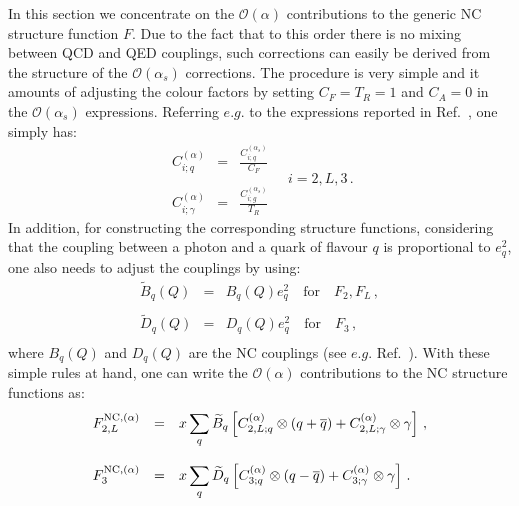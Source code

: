 In this section we concentrate on the $\mathcal{O}(\alpha)$
contributions to the generic NC structure function $F$. Due to the
fact that to this order there is no mixing between QCD and QED
couplings, such corrections can easily be derived from the structure
of the $\mathcal{O}(\alpha_s)$ corrections. The procedure is very
simple and it amounts of adjusting the colour factors by setting
$C_F=T_R=1$ and $C_A=0$ in the $\mathcal{O}(\alpha_s)$
expressions. Referring $e.g.$ to the expressions reported in
Ref.~\cite{Ellis:1991qj}, one simply has:
\begin{equation}\label{eq:alphaCFs}
\begin{array}{rcl}
\displaystyle C_{i;q}^{(\alpha)} &=& \displaystyle \frac{C_{i;q}^{(\alpha_s)}}{C_F}\\
\\
\displaystyle C_{i;\gamma}^{(\alpha)} &=& \displaystyle \frac{C_{i;g}^{(\alpha_s)}}{T_R}
\end{array}\quad i = 2,L,3\,.
\end{equation}
In addition, for constructing the corresponding structure functions,
considering that the coupling between a photon and a quark of flavour
$q$ is proportional to $e_q^2$, one also needs to adjust the couplings
by using:
 \begin{equation}
\begin{array}{rcl}
\widetilde{B}_q(Q) &=& B_q(Q)e_q^2\quad\mbox{for}\quad F_2,F_L\,, \\
\\
\widetilde{D}_q(Q) &=& D_q(Q)e_q^2\quad\mbox{for}\quad F_3\,, \\
\end{array}
\end{equation}
where $B_q(Q)$ and $D_q(Q)$ are the NC couplings (see $e.g.$
Ref.~\cite{Adloff:2003uh}). With these simple rules at hand, one can
write the $\mathcal{O}(\alpha)$ contributions to the NC structure
functions as:
\begin{equation}
\begin{array}{rcl}
F_{2,L}^{{\rm NC},(\alpha)} &=& \displaystyle x \sum_{q} \widetilde{B}_q\left[C_{2,L;q}^{(\alpha)}\otimes
(q+\overline{q}) + C_{2,L;\gamma}^{(\alpha)} \otimes \gamma
                         \right]\,,\\
\\
F_3^{{\rm NC},(\alpha)} &=& \displaystyle x \sum_{q} \widetilde{D}_q\left[C_{3;q}^{(\alpha)}\otimes
(q-\overline{q}) + C_{3;\gamma}^{(\alpha)} \otimes \gamma
                         \right]\,.
\end{array}
\end{equation}

